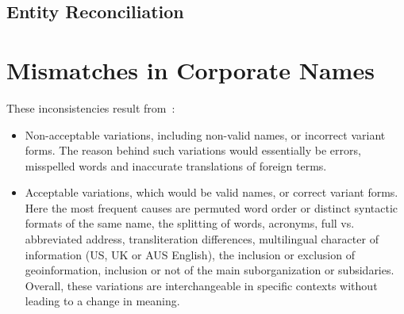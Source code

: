 \documentclass{llncs}
\begin{document}
\subsection{Entity Reconciliation}




\section{Mismatches in Corporate Names}
These inconsistencies result from~\cite{Galvez2006,Morillo:2013:TAA:2424697.2424727}:
\begin{itemize}
 \item Non-acceptable variations, including non-valid names, or incorrect
variant forms. The reason behind such variations would essentially be
errors, misspelled words and inaccurate translations of foreign terms.

\item Acceptable variations, which would be valid names, or correct variant
forms. Here the most frequent causes are permuted word order or distinct
syntactic formats of the same name, the splitting of words, acronyms, full
vs. abbreviated address, transliteration differences, multilingual character 
of information (US, UK or AUS English), the inclusion or exclusion of geoinformation, 
inclusion or not of the main suborganization or subsidaries. Overall, these variations are 
interchangeable in specific contexts without leading to a change in meaning.
\end{itemize}



% 
% 
% 
\end{document}
